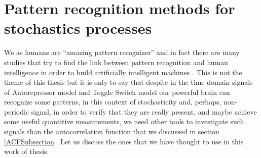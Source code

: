 \documentclass[12pt,a4paper]{report}
\begin{document}
\chapter{Pattern recognition methods for stochastics processes}\label{ChapterPatternRecognition}
We as humans are ``amazing pattern recognizer'' and in fact there are many studies that try to find the link between pattern recognition and human intelligence in order to build artificially intelligent machines \cite{PR}. This is not the theme of this thesis but it is only to say that despite in the time domain signals of Autorepressor model and Toggle Switch model our powerful brain can recognize some patterns, in this context of stochasticity and, perhaps, non-periodic signal, in order to verify that they are really present, and maybe achieve some useful quantitive measurements, we need other tools to investigate such signals than the autocorrelation function that we discussed in section \ref{ACFSubsection}. Let us discuss the ones that we have thought to use in this work of thesis.
\end{document}
